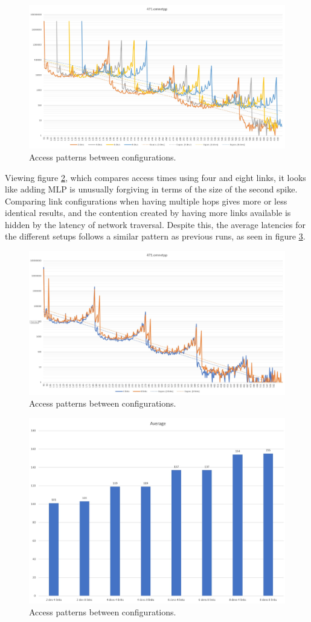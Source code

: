 \begin{figure}[!ht]
    \centering
    \includegraphics[width=0.75\linewidth]{figure/471-x_4.jpg}
    \caption{Access patterns between configurations.}
    \label{Memory-access-471}
\end{figure}

Viewing figure \ref{Memory-access-471-link-compare}, which compares access times using four and eight links, it looks like adding MLP is unusually forgiving in terms of the size of the second spike. Comparing link configurations when having multiple hops gives more or less identical results, and the contention created by having more links available is hidden by the latency of network traversal. Despite this, the average latencies for the different setups follows a similar pattern as previous runs, as seen in figure \ref{Memory-access-471-averages}.

\begin{figure}[!ht]
    \centering
    \includegraphics[width=0.75\linewidth]{figure/471-2_4-8.jpg}
    \caption{Access patterns between configurations.}
    \label{Memory-access-471-link-compare}
\end{figure}

\begin{figure}[!ht]
    \centering
    \includegraphics[width=0.75\linewidth]{figure/471-averages.jpg}
    \caption{Access patterns between configurations.}
    \label{Memory-access-471-averages}
\end{figure}

